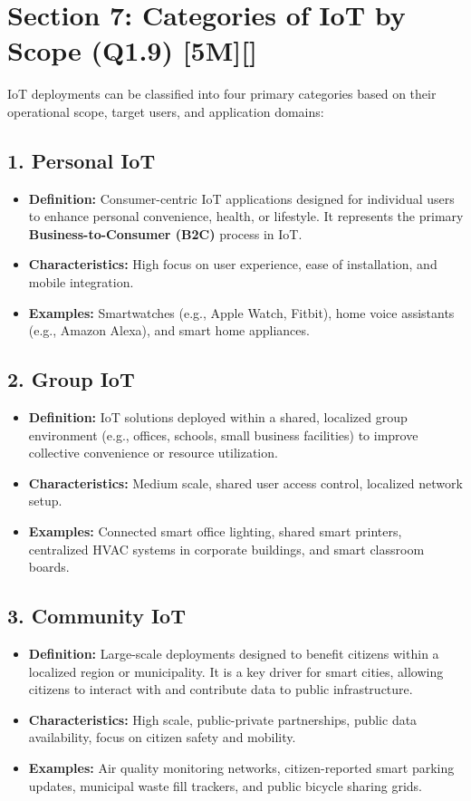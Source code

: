 \section{Section 7: Categories of IoT by Scope (Q1.9) [5M][]}

IoT deployments can be classified into four primary categories based on their operational scope, target users, and application domains:

\subsection{1. Personal IoT}
\begin{itemize}
  \item   \textbf{Definition:} Consumer-centric IoT applications designed for individual users to enhance personal convenience, health, or lifestyle. It represents the primary \textbf{Business-to-Consumer (B2C)} process in IoT.
  \item   \textbf{Characteristics:} High focus on user experience, ease of installation, and mobile integration.
  \item   \textbf{Examples:} Smartwatches (e.g., Apple Watch, Fitbit), home voice assistants (e.g., Amazon Alexa), and smart home appliances.
\end{itemize}

\subsection{2. Group IoT}
\begin{itemize}
  \item   \textbf{Definition:} IoT solutions deployed within a shared, localized group environment (e.g., offices, schools, small business facilities) to improve collective convenience or resource utilization.
  \item   \textbf{Characteristics:} Medium scale, shared user access control, localized network setup.
  \item   \textbf{Examples:} Connected smart office lighting, shared smart printers, centralized HVAC systems in corporate buildings, and smart classroom boards.
\end{itemize}

\subsection{3. Community IoT}
\begin{itemize}
  \item   \textbf{Definition:} Large-scale deployments designed to benefit citizens within a localized region or municipality. It is a key driver for smart cities, allowing citizens to interact with and contribute data to public infrastructure.
  \item   \textbf{Characteristics:} High scale, public-private partnerships, public data availability, focus on citizen safety and mobility.
  \item   \textbf{Examples:} Air quality monitoring networks, citizen-reported smart parking updates, municipal waste fill trackers, and public bicycle sharing grids.
\end{itemize}

